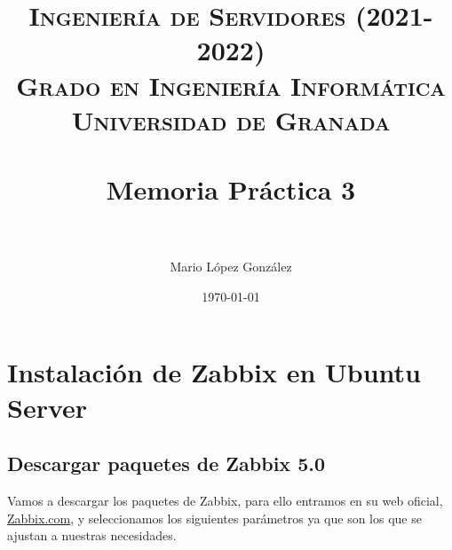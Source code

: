 

\title{	
\normalfont \normalsize 
\textsc{\textbf{Ingeniería de Servidores (2021-2022)} \\ Grado en Ingeniería Informática \\ Universidad de Granada} \\ [25pt] %
\horrule{0.5pt} \\[0.4cm] %
\huge Memoria Práctica 3 \\ %
\horrule{2pt} \\[0.5cm] %
}

\author{Mario López González} %

\date{\normalsize\today} %




\maketitle %

\newpage %

\tableofcontents %
\listoffigures %

\newpage


\section{Instalación de Zabbix en Ubuntu Server}
\subsection{Descargar paquetes de Zabbix 5.0}

    Vamos a descargar los paquetes de Zabbix, para ello entramos en su web oficial, \href{https://www.zabbix.com/download}{Zabbix.com}, y 
    seleccionamos los siguientes parámetros ya que son los que se ajustan a nuestras necesidades.
        
